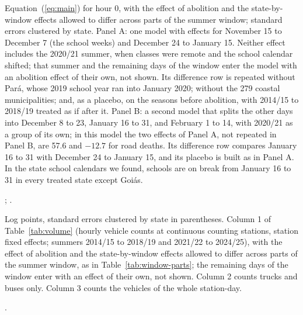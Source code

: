 \begin{table}[tbp]
  \caption{The Hour after Sunset in Parts of the Summer Window}
  \label{tab:window-parts}
  \centering\footnotesize\setlength{\tabcolsep}{5pt}
  
  \begin{tablenotes}[Notes]
  Equation~(\ref{eq:main}) for hour 0, with the effect of abolition and the state-by-window effects allowed to differ across parts of the summer window; standard errors clustered by state. Panel A: one model with effects for November 15 to December 7 (the school weeks) and December 24 to January 15. Neither effect includes the 2020/21 summer, when classes were remote and the school calendar shifted; that summer and the remaining days of the window enter the model with an abolition effect of their own, not shown. Its difference row is repeated without Par\'a, whose 2019 school year ran into January 2020; without the 279 coastal municipalities; and, as a placebo, on the seasons before abolition, with 2014/15 to 2018/19 treated as if after it. Panel B: a second model that splits the other days into December 8 to 23, January 16 to 31, and February 1 to 14, with 2020/21 as a group of its own; in this model the two effects of Panel A, not repeated in Panel B, are 57.6 and $-12.7$ for road deaths. Its difference row compares January 16 to 31 with December 24 to January 15, and its placebo is built as in Panel A. In the state school calendars we found, schools are on break from January 16 to 31 in every treated state except Goi\'as.
  \end{tablenotes}
  \begin{tablenotes}[Sources]
  \citet{datasus2025sim}; \citet{prf2025dados}.
  \end{tablenotes}
\end{table}


\begin{table}[tbp]
  \caption{Federal Highway Traffic in Parts of the Summer Window}
  \label{tab:traffic-parts}
  \centering\footnotesize\setlength{\tabcolsep}{5pt}
  
  \begin{tablenotes}[Notes]
  Log points, standard errors clustered by state in parentheses. Column 1 of Table~\ref{tab:volume} (hourly vehicle counts at continuous counting stations, station fixed effects; summers 2014/15 to 2018/19 and 2021/22 to 2024/25), with the effect of abolition and the state-by-window effects allowed to differ across parts of the summer window, as in Table~\ref{tab:window-parts}; the remaining days of the window enter with an effect of their own, not shown. Column 2 counts trucks and buses only. Column 3 counts the vehicles of the whole station-day.
  \end{tablenotes}
  \begin{tablenotes}[Sources]
  \citet{dnit2025pnct}.
  \end{tablenotes}
\end{table}

